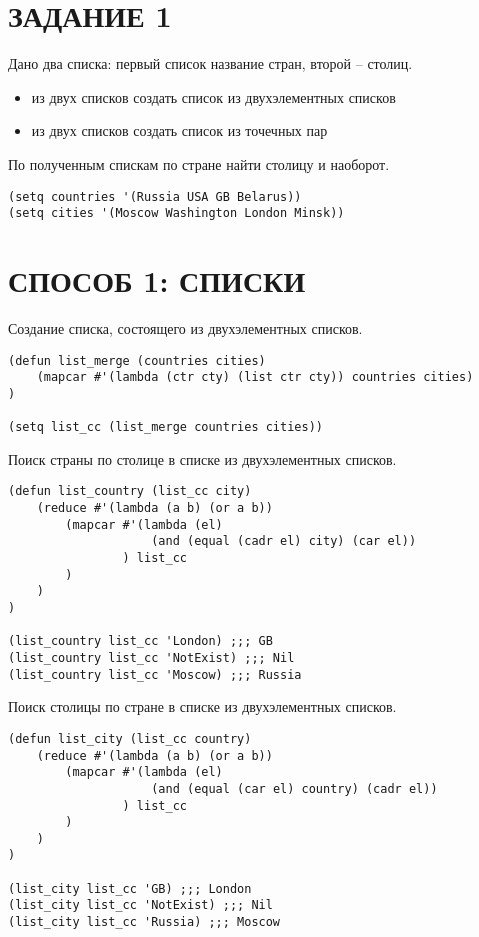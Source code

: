 \section{ЗАДАНИЕ 1}

Дано два списка: первый список название стран, второй -- столиц.

\begin{itemize}
    \item из двух списков создать список из двухэлементных списков
    \item из двух списков создать список из точечных пар
\end{itemize}

По полученным спискам по стране найти столицу и наоборот.

\begin{lstlisting}
(setq countries '(Russia USA GB Belarus))
(setq cities '(Moscow Washington London Minsk))
\end{lstlisting}

\section{СПОСОБ 1: СПИСКИ}

Создание списка, состоящего из двухэлементных списков.

\begin{lstlisting}
(defun list_merge (countries cities)
    (mapcar #'(lambda (ctr cty) (list ctr cty)) countries cities)
)

(setq list_cc (list_merge countries cities))
\end{lstlisting}

Поиск страны по столице в списке из двухэлементных списков.

\begin{lstlisting}
(defun list_country (list_cc city)
    (reduce #'(lambda (a b) (or a b))
        (mapcar #'(lambda (el)
                    (and (equal (cadr el) city) (car el))
                ) list_cc
        )
    )
)

(list_country list_cc 'London) ;;; GB
(list_country list_cc 'NotExist) ;;; Nil
(list_country list_cc 'Moscow) ;;; Russia
\end{lstlisting}

Поиск столицы по стране в списке из двухэлементных списков.

\begin{lstlisting}
(defun list_city (list_cc country)
    (reduce #'(lambda (a b) (or a b))
        (mapcar #'(lambda (el)
                    (and (equal (car el) country) (cadr el))
                ) list_cc
        )
    )
)

(list_city list_cc 'GB) ;;; London
(list_city list_cc 'NotExist) ;;; Nil
(list_city list_cc 'Russia) ;;; Moscow
\end{lstlisting}

